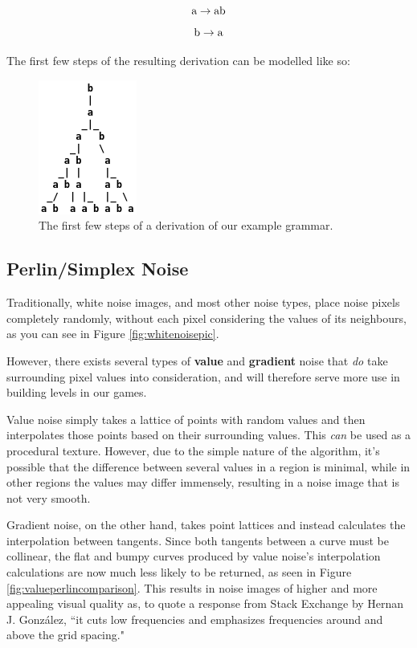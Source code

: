 $$ \mbox{a} \rightarrow \mbox{a}\mbox{b} $$
$$ \mbox{b} \rightarrow \mbox{a} $$

The first few steps of the resulting derivation can be modelled like so:

\begin{figure}[H]
    \centering
    \includegraphics[scale=0.5]{Images/derivationtree.png}
    \caption{The first few steps of a derivation of our example grammar.\cite{lsystemintro}}
    \label{fig:derivationtree}
\end{figure}

\subsection{Perlin/Simplex Noise}

Traditionally, white noise images, and most other noise types, place noise pixels completely randomly, without each pixel considering the values of its neighbours\cite{gd3perlinnoise}, as you can see in Figure \ref{fig:whitenoisepic}.

However, there exists several types of \textbf{value} and \textbf{gradient} noise that \textit{do} take surrounding pixel values into consideration, and will therefore serve more use in building levels in our games.

Value noise simply takes a lattice of points with random values and then interpolates those points based on their surrounding values. This \textit{can} be used as a procedural texture. However, due to the simple nature of the algorithm, it's possible that the difference between several values in a region is minimal, while in other regions the values may differ immensely, resulting in a noise image that is not very smooth.

Gradient noise, on the other hand, takes point lattices and instead calculates the interpolation between tangents.\cite{perlinvalue} Since both tangents between a curve must be collinear\cite{perlinvalue}, the flat and bumpy curves produced by value noise's interpolation calculations are now much less likely to be returned, as seen in Figure \ref{fig:valueperlincomparison}.\cite{perlinvalue} This results in noise images of higher and more appealing visual quality as, to quote a response from Stack Exchange by Hernan J. González\cite{gradientvalue}, ``it cuts low frequencies and emphasizes frequencies around and above the grid spacing."

